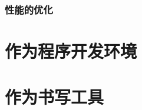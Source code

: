 \documentclass[11pt]{article}
\begin{document}
\subsubsection{性能的优化}
\label{sec:orgd8dd499}


\section{作为程序开发环境}
\label{sec:org5478967}


\section{作为书写工具}
\label{sec:orga7fa52d}

\section{}
\label{sec:orge5858dc}
\end{document}
